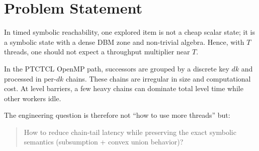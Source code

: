 \section{Problem Statement}
In timed symbolic reachability, one explored item is not a cheap scalar state; it is a symbolic state with a dense DBM zone and non-trivial algebra.
Hence, with $T$ threads, one should not expect a throughput multiplier near $T$.

In the PTCTCL OpenMP path, successors are grouped by a discrete key $dk$ and processed in per-$dk$ chains.
These chains are irregular in size and computational cost.
At level barriers, a few heavy chains can dominate total level time while other workers idle.

The engineering question is therefore not ``how to use more threads'' but:
\begin{quote}
How to reduce chain-tail latency while preserving the exact symbolic semantics (subsumption + convex union behavior)?
\end{quote}

